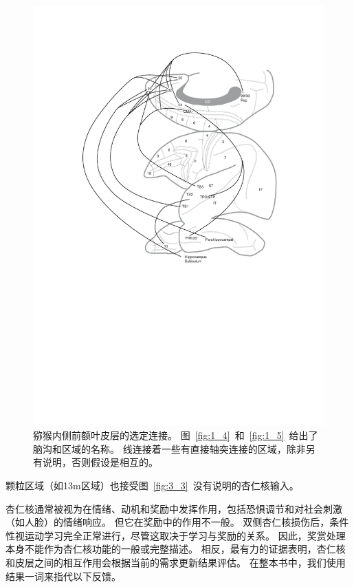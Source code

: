 \begin{figure}[!htb]
	\centering
	\includegraphics{chap3/3_2}
	\caption{猕猴内侧前额叶皮层的选定连接。
		图~\ref{fig:1_4}~和~\ref{fig:1_5}~给出了脑沟和区域的名称。
		线连接着一些有直接轴突连接的区域，除非另有说明，否则假设是相互的。}
	\label{fig:3_2}
\end{figure}


颗粒区域\cite{prather2001increased,morecraft2007amygdala}（如13m区域）也接受图~\ref{fig:3_3}~没有说明的杏仁核输入\cite{saleem2008complementary}。\par
杏仁核通常被视为在情绪、动机和奖励中发挥作用，包括恐惧调节和对社会刺激（如人脸）的情绪响应。
但它在奖励中的作用不一般。
双侧杏仁核损伤后，条件性视运动学习完全正常进行，尽管这取决于学习与奖励的关系\cite{murray1996role}。
因此，奖赏处理本身不能作为杏仁核功能的一般或完整描述。
相反，最有力的证据表明，杏仁核和皮层之间的相互作用会根据当前的需求更新结果评估\cite{baxter2002amygdala}。
在整本书中，我们使用结果一词来指代以下反馈。\par


